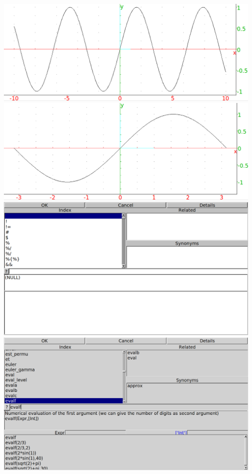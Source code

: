 \documentclass{article}
\begin{document}
\includegraphics[width=\textwidth]{./xcas-sinplot.png}
\clearpage%
\includegraphics[width=\textwidth]{./xcas-sinplot2.png}
\clearpage%
\includegraphics[width=\textwidth]{./xcas-help-index.png}
\clearpage%
\includegraphics[width=\textwidth]{./xcas-help-evalf.png}
\end{document}
